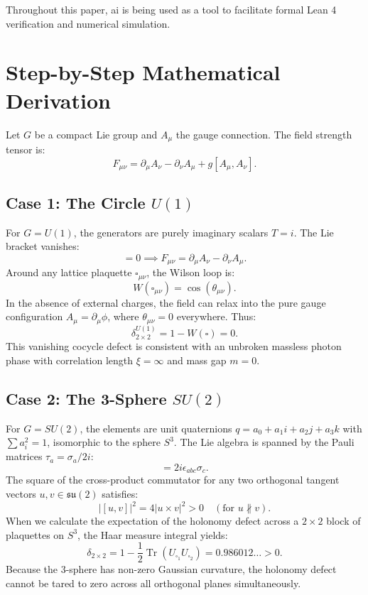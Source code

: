 \documentclass[11pt,a4paper]{article}
\theoremstyle{definition}
\begin{document}
Throughout this paper, ai is being used as a tool to facilitate formal Lean 4 verification and numerical simulation.

\section{Step-by-Step Mathematical Derivation}

Let $G$ be a compact Lie group and $A_\mu$ the gauge connection. The field strength tensor is:
\begin{equation}
F_{\mu\nu} = \partial_\mu A_\nu - \partial_\nu A_\mu + g [A_\mu, A_\nu].
\end{equation}

\subsection{Case 1: The Circle $U(1)$}
For $G = U(1)$, the generators are purely imaginary scalars $T = i$. The Lie bracket vanishes:
\begin{equation}
[A_\mu, A_\nu] = 0 \implies F_{\mu\nu} = \partial_\mu A_\nu - \partial_\nu A_\mu.
\end{equation}
Around any lattice plaquette $\square_{\mu\nu}$, the Wilson loop is:
\begin{equation}
W(\square_{\mu\nu}) = \cos(\theta_{\mu\nu}).
\end{equation}
In the absence of external charges, the field can relax into the pure gauge configuration $A_\mu = \partial_\mu \phi$, where $\theta_{\mu\nu} = 0$ everywhere. Thus:
\begin{equation}
\delta_{2 \times 2}^{U(1)} = 1 - W(\square) = 0.
\end{equation}
This vanishing cocycle defect is consistent with an unbroken massless photon phase with correlation length $\xi = \infty$ and mass gap $m = 0$.

\subsection{Case 2: The 3-Sphere $SU(2)$}
For $G = SU(2)$, the elements are unit quaternions $q = a_0 + a_1 i + a_2 j + a_3 k$ with $\sum a_i^2 = 1$, isomorphic to the sphere $S^3$. The Lie algebra is spanned by the Pauli matrices $\tau_a = \sigma_a / 2i$:
\begin{equation}
[\sigma_a, \sigma_b] = 2i \epsilon_{abc} \sigma_c.
\end{equation}
The square of the cross-product commutator for any two orthogonal tangent vectors $u, v \in \mathfrak{su}(2)$ satisfies:
\begin{equation}
|[u, v]|^2 = 4 |u \times v|^2 > 0 \quad (\text{for } u \not\parallel v).
\end{equation}
When we calculate the expectation of the holonomy defect across a $2 \times 2$ block of plaquettes on $S^3$, the Haar measure integral yields:
\begin{equation}
\delta_{2 \times 2} = 1 - \frac{1}{2}\operatorname{Tr}(U_{\square_1} U_{\square_2}) = 0.986012 \dots > 0.
\end{equation}
Because the 3-sphere has non-zero Gaussian curvature, the holonomy defect cannot be tared to zero across all orthogonal planes simultaneously.
\end{document}
